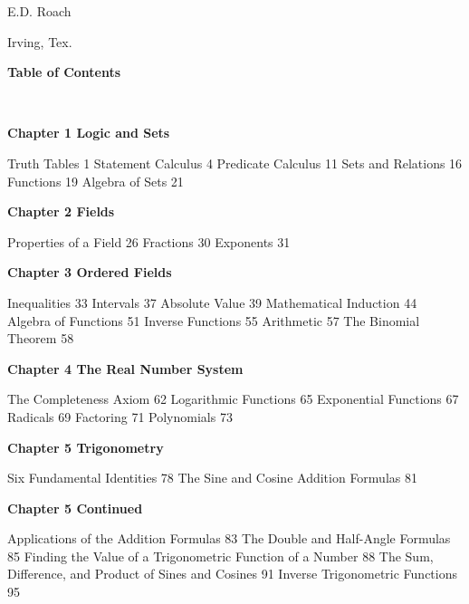\begin{large}
\hfill E.D. Roach

\hfill Irving, Tex.

\newpage
\thispagestyle{empty}
\begin{center}
\textbf{Table of Contents}
\end{center}

$ $ \nl


\fl \textbf{Chapter 1 Logic and Sets} \newline

 Truth Tables  \hfill 1  Statement Calculus \hfill 4  Predicate Calculus \hfill 11  Sets and Relations \hfill 16  Functions \hfill 19  Algebra of Sets \hfill 21\nl

\textbf{Chapter 2 Fields} \nl

 Properties of a Field \hfill 26  Fractions  \hfill 30  Exponents  \hfill 31 \nl


\textbf{Chapter 3 Ordered Fields} \nl

 Inequalities \hfill 33 Intervals  \hfill 37  Absolute Value \hfill 39 Mathematical Induction \hfill 44 Algebra of Functions \hfill 51 Inverse Functions \hfill 55 Arithmetic \hfill 57 The Binomial Theorem \hfill 58 \nl

\textbf{Chapter 4 The Real Number System} \nl

 The Completeness Axiom \hfill 62 Logarithmic Functions \hfill 65 Exponential Functions \hfill 67 Radicals \hfill 69 Factoring \hfill 71 Polynomials \hfill 73\nl

\textbf{Chapter 5 Trigonometry} \nl

 Six Fundamental Identities \hfill 78 The Sine and Cosine Addition Formulas \hfill 81\nl

\newpage
\thispagestyle{empty}

\textbf{Chapter 5 Continued}\nl

 Applications of the Addition Formulas \hfill 83 The Double and Half-Angle Formulas \hfill 85 Finding the Value of a Trigonometric Function of a Number \hfill 88 The Sum, Difference, and Product of Sines and Cosines \hfill 91 Inverse Trigonometric Functions \hfill 95\nl


\end{large}
